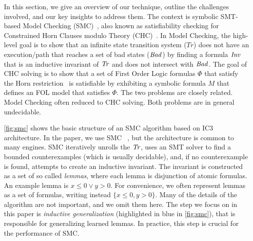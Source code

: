 In this section, we give an overview of our technique, outline the challenges
involved, and our key insights to address them. The context is symbolic
SMT-based Model Checking (SMC)~\cite{IC3,GPDR,spacer}, also known as
satisfiability checking for Constrained Horn Clauses modulo Theory
(CHC)~\cite{DBLP:conf/birthday/BjornerGMR15}. In Model Checking, the high-level
goal is to show that an infinite state transition system ($Tr$) does not have an
execution/path that reaches a set of bad states ($\mathit{Bad}$) by finding a formula
$\mathit{Inv}$ that is an inductive invariant of $\mathit{Tr}$ and does not intersect with
$\mathit{Bad}$. The goal of CHC solving is to show that a set of First Order Logic
formulas $\Phi$ that satisfy the Horn
restriction~\cite{DBLP:conf/birthday/BjornerGMR15} is satisfiable by exhibiting
a symbolic formula $M$ that defines an FOL model that satisfies $\Phi$. The two
problems are closely related. Model Checking often reduced to CHC solving. Both
problems are in general undecidable.

\cref{fig:smc} shows the basic structure of an SMC algorithm based on IC3
architecture. In the paper, we use SMC \spc~\cite{spacer}, but the architecture is
common to many engines. SMC iteratively unrolls the $\mathit{Tr}$, uses an SMT solver to
find a bounded counterexamples (which is usually decidable), and, if no
counterexample is found, attempts to create an inductive invariant. The
invariant is constructed as a set of so called \emph{lemmas}, where each lemma
is disjunction of atomic formulas. An example lemma is $x \leq 0 \lor y > 0$.
For convenience, we often represent lemmas as a set of formulas, writing instead
$\{x \leq 0,y > 0\}$. Many of the details of the algorithm are not important,
and we omit them here. The step we focus on in this paper is \emph{inductive
  generalization} (highlighted in blue in \cref{fig:smc}), that is responsible
for generalizing learned lemmas. In practice, this step is crucial for the
performance of SMC.


